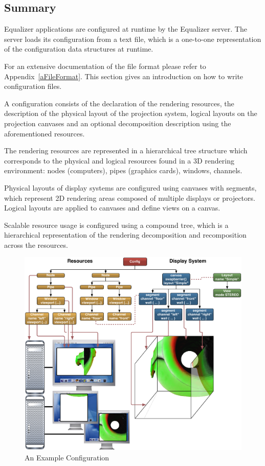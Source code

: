 \documentclass[10pt,a4]{scrartcl}
\newcommand{\aref}[1]{Appendix~\ref{#1}}
\begin{document}
\subsection{Summary}

Equalizer applications are configured at runtime by the Equalizer
server. The server loads its configuration from a text file, which is a
one-to-one representation of the configuration data structures at
runtime.

For an extensive documentation of the file format please refer to
\aref{aFileFormat}. This section gives an introduction on how to write
configuration files.

A configuration consists of the declaration of the rendering resources, the
description of the physical layout of the projection system, logical layouts on
the projection canvases and an optional decomposition description using the
aforementioned resources.

The rendering resources are represented in a hierarchical tree structure
which corresponds to the physical and logical resources found in a 3D
rendering environment: nodes (computers), pipes (graphics cards),
windows, channels. 

Physical layouts of display systems are configured using canvases with
segments, which represent 2D rendering areas composed of multiple
displays or projectors. Logical layouts are applied to canvases and
define views on a canvas.

Scalable resource usage is configured using a compound tree, which is a
hierarchical representation of the rendering decomposition and
recomposition across the resources.

\begin{figure}[ht!]\center
  \includegraphics[width=\textwidth]{images/cave.pdf}
  {\caption{\label{fConfig}An Example Configuration}}
\end{figure}
\end{document}
